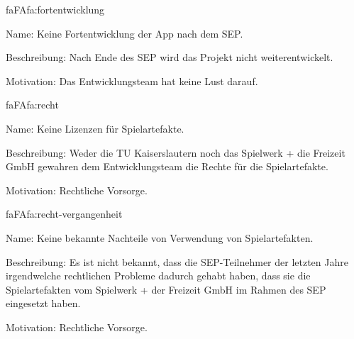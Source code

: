 \begin{description}[leftmargin=5em, style=sameline]
	
	\begin{lhp}{fa}{FA}{fa:fortentwicklung}
		\item [Name:] Keine Fortentwicklung der App nach dem SEP.
		\item [Beschreibung:] Nach Ende des SEP wird das Projekt nicht weiterentwickelt.
		\item [Motivation:] Das Entwicklungsteam hat keine Lust darauf.
	\end{lhp}
	
	\begin{lhp}{fa}{FA}{fa:recht}
		\item [Name:] Keine Lizenzen für Spielartefakte.
		\item [Beschreibung:] Weder die TU Kaiserslautern noch das Spielwerk + die Freizeit GmbH gewahren dem Entwicklungsteam die Rechte für die Spielartefakte.
		\item [Motivation:] Rechtliche Vorsorge.
	\end{lhp}
	
	\begin{lhp}{fa}{FA}{fa:recht-vergangenheit}
		\item [Name:] Keine bekannte Nachteile von Verwendung von Spielartefakten.
		\item [Beschreibung:] Es ist nicht bekannt, dass die SEP-Teilnehmer der letzten Jahre irgendwelche rechtlichen Probleme dadurch gehabt haben, dass sie die Spielartefakten vom Spielwerk + der Freizeit GmbH im Rahmen des SEP eingesetzt haben.
		\item [Motivation:] Rechtliche Vorsorge.
	\end{lhp}
	
	
\end{description}

